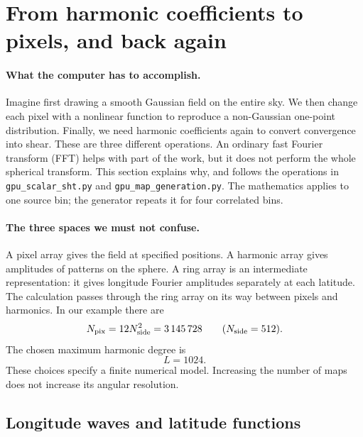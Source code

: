 \section{From harmonic coefficients to pixels, and back again}
\label{sec:sht-teaching}

\paragraph{What the computer has to accomplish.}
Imagine first drawing a smooth Gaussian field on the entire sky. We then
change each pixel with a nonlinear function to reproduce a non-Gaussian
one-point distribution. Finally, we need harmonic coefficients again to
convert convergence into shear. These are three different operations. An
ordinary fast Fourier transform (FFT) helps with part of the work, but it
does not perform the whole spherical transform. This section explains why,
and follows the operations in \texttt{gpu\_scalar\_sht.py} and
\texttt{gpu\_map\_generation.py}. The mathematics applies to one source bin;
the generator repeats it for four correlated bins.

\paragraph{The three spaces we must not confuse.}
A pixel array gives the field at specified positions. A harmonic array
gives amplitudes of patterns on the sphere. A ring array is an intermediate
representation: it gives longitude Fourier amplitudes separately at each
latitude. The calculation passes through the ring array on its way between
pixels and harmonics. In our example there are
\begin{equation}
 N_{\rm pix}=12N_{\rm side}^{2}=3\,145\,728
 \qquad (N_{\rm side}=512).
\end{equation}
The chosen maximum harmonic degree is
\begin{equation}
 L=1024.
\end{equation}
These choices specify a finite numerical model. Increasing the number of
maps does not increase its angular resolution.

\subsection{Longitude waves and latitude functions}

